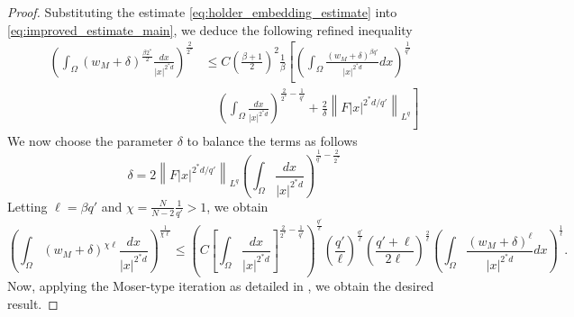\documentclass[11pt]{article}
\begin{document}
\begin{proof}
Substituting the estimate \eqref{eq:holder_embedding_estimate} into \eqref{eq:improved_estimate_main}, we deduce the following refined inequality
\begin{equation*}
\begin{aligned}
    \left( \int_\Omega (w_M + \delta)^{\frac{\beta 2^*}{2}} \frac{dx}{|x|^{2^* d}} \right)^{\frac{2}{2^*}}
    &\leq C \left( \frac{\beta + 1}{2} \right)^2 \frac{1}{\beta}
    \left[ \left( \int_\Omega \frac{(w_M + \delta)^{\beta q'}}{|x|^{2^* d}} dx \right)^{\frac{1}{q'}} \right. \\
    &\quad \left. \left( \int_\Omega \frac{dx}{|x|^{2^* d}} \right)^{\frac{2}{2^*} - \frac{1}{q'}} + \frac{2}{\delta} \left\| F  |x|^{2^* d/q'} \right\|_{L^q} \right]
\end{aligned}
\end{equation*}
We now choose the parameter \( \delta \) to balance the terms as follows
\begin{equation*}
    \delta = 2 \left\| F  |x|^{2^* d/q'} \right\|_{L^q} 
    \left( \int_\Omega \frac{dx}{|x|^{2^* d}} \right)^{\frac{1}{q'} - \frac{2}{2^*}}
\end{equation*}
Letting \( \ell = \beta q' \) and $ \chi = \frac{N}{N - 2}  \frac{1}{q'} > 1$, we obtain
\begin{equation*}
    \left( \int_\Omega (w_M + \delta)^{\chi \ell} \frac{dx}{|x|^{2^* d}} \right)^{\frac{1}{\chi \ell}}
    \leq \left( C \left[ \int_\Omega \frac{dx}{|x|^{2^* d}} \right]^{\frac{2}{2^*} - \frac{1}{q'}} \right)^{\frac{q'}{\ell}}
    \left( \frac{q'}{\ell} \right)^{\frac{q'}{\ell}}
    \left( \frac{q' + \ell}{2\ell} \right)^{\frac{2}{\ell}}  \left( \int_\Omega \frac{(w_M + \delta)^{\ell}}{|x|^{2^* d}} dx \right)^{\frac{1}{\ell}}.
\end{equation*}
Now, applying the Moser-type iteration as detailed in \cite[Theorem $3.1$]{brasco_second_eigenvalue}, we obtain the desired result.
\end{proof}
\end{document}
